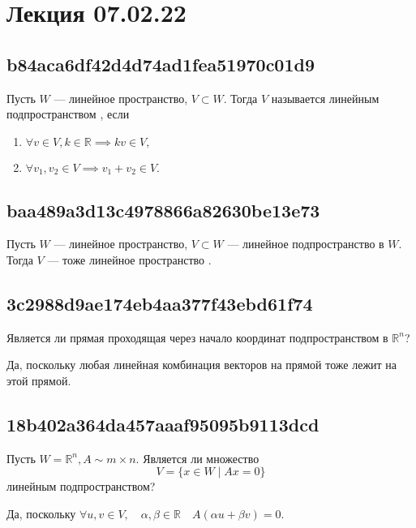 \documentclass[11pt, a5paper]{article}
\newenvironment{note}[1]{\goodbreak\par\subsection{\hfill \color{lightgray}\tiny #1}}{}
\newenvironment{cloze}[2][\ldots]{\begin{leftbar}}{\end{leftbar}}
\newenvironment{icloze}[2][\ldots]{%
  \ignorespaces\text{\tiny \color{lightgray} \{\{c#2:: }%
}{%
  \text{\tiny \color{lightgray}\}\}}\unskip%
}
\begin{document}
\section{Лекция 07.02.22}
\begin{note}{b84aca6df42d4d74ad1fea51970c01d9}
    Пусть \begin{icloze}{3}\( W \) --- линейное пространство, \( V \subset W. \) \end{icloze} Тогда \( V \) называется \begin{icloze}{2}линейным подпространством\end{icloze}, если
    \begin{icloze}{1}
        \begin{enumerate}
            \item \( \forall v \in V, k \in \mathbb R \implies kv \in V,  \)
            \item \( \forall v_1, v_2 \in V \implies v_1 + v_2 \in V. \)
        \end{enumerate}
    \end{icloze}
\end{note}

\begin{note}{baa489a3d13c4978866a82630be13e73}
    Пусть \( W \) --- линейное пространство, \( V \subset W \) --- линейное подпространство в \( W \). Тогда \( V \) --- \begin{icloze}{1}тоже линейное пространство\end{icloze}.
\end{note}

\begin{note}{3c2988d9ae174eb4aa377f43ebd61f74}
    Является ли прямая проходящая через начало координат подпространством в \( \mathbb R ^{n}  \)?

    \begin{cloze}{1}
        Да, поскольку любая линейная комбинация векторов на прямой тоже лежит на этой прямой.
    \end{cloze}
\end{note}

\begin{note}{18b402a364da457aaaf95095b9113dcd}
    Пусть \( W = \mathbb R ^{n}, A \sim m \times n. \)
    Является ли множество
    \[
        V = \{ x \in W \mid Ax = 0  \}
    \]
    линейным подпространством?

    \begin{cloze}{1}
        Да, поскольку \( \forall u, v \in V, \quad \alpha, \beta \in \mathbb R \quad A(\alpha u + \beta v) = 0. \)
    \end{cloze}
\end{note}
\end{document}
